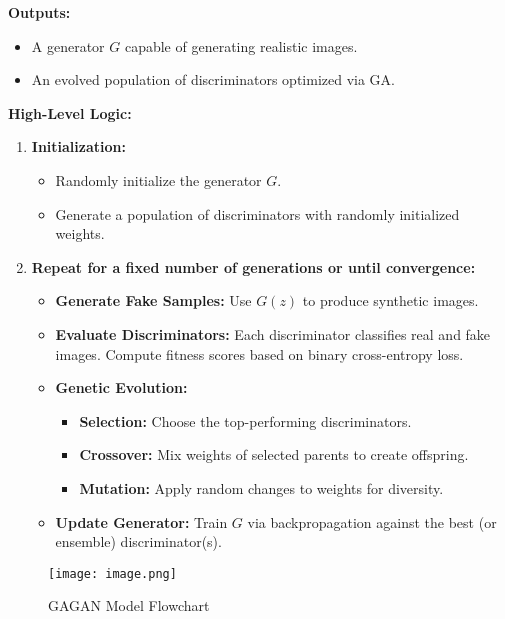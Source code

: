 \documentclass[a4paper,12pt]{article}
\begin{document}
\vspace{0.5em}
\textbf{Outputs:}
\begin{itemize}
    \item A generator $G$ capable of generating realistic images.
    \item An evolved population of discriminators optimized via GA.
\end{itemize}

\vspace{0.5em}
\textbf{High-Level Logic:}
\begin{enumerate}
    \item \textbf{Initialization:}
    \begin{itemize}
        \item Randomly initialize the generator $G$.
        \item Generate a population of discriminators with randomly initialized weights.
    \end{itemize}
    
    \item \textbf{Repeat for a fixed number of generations or until convergence:}
    \begin{itemize}
        \item \textbf{Generate Fake Samples:} Use $G(z)$ to produce synthetic images.
        \item \textbf{Evaluate Discriminators:} Each discriminator classifies real and fake images. Compute fitness scores based on binary cross-entropy loss.
        \item \textbf{Genetic Evolution:}
        \begin{itemize}
            \item \textbf{Selection:} Choose the top-performing discriminators.
            \item \textbf{Crossover:} Mix weights of selected parents to create offspring.
            \item \textbf{Mutation:} Apply random changes to weights for diversity.
        \end{itemize}
        \item \textbf{Update Generator:} Train $G$ via backpropagation against the best (or ensemble) discriminator(s).
    \end{itemize}
\end{enumerate}

\begin{figure}[H] %
\centering
\texttt{[image: image.png]}
\caption{GAGAN Model Flowchart}
\label{fig:enter-label}
\end{figure}
\end{document}
